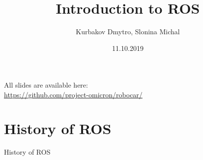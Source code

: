 \documentclass{beamer}
\begin{document}
\title{Introduction to ROS} 
\author{Kurbakov Dmytro, Slonina Michal}

\date{11.10.2019}

\begin{frame}
\titlepage
\end{frame}

\begin{frame}
All slides are available here:\\
\url{https://github.com/project-omicron/robocar/}
\end{frame}

\section{History of ROS} 
\begin{frame}
\begin{center}
\Huge History of ROS
\end{center}
\end{frame}
\end{document}
